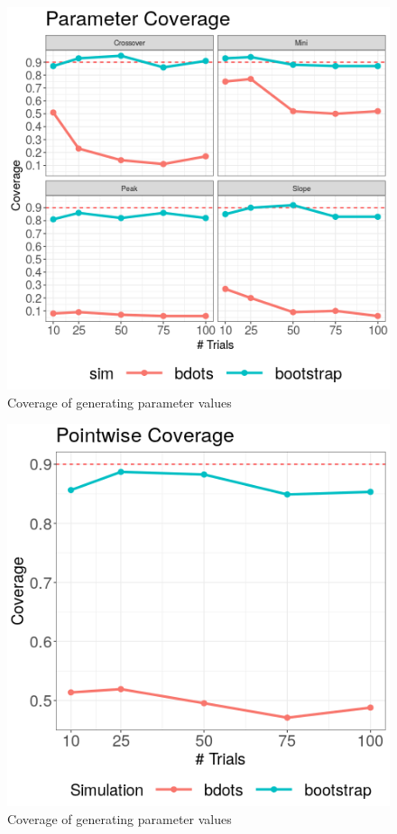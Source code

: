 \documentclass{article}
\begin{document}
\begin{figure}[h!]
\centering
\includegraphics[scale=0.65]{img/par_coverage.png}
\caption{Coverage of generating parameter values}
\end{figure}

\begin{figure}[h!]
\centering
\includegraphics[scale=0.5]{img/pointwise_cover.png}
\caption{Coverage of generating parameter values}
\end{figure}
\end{document}
